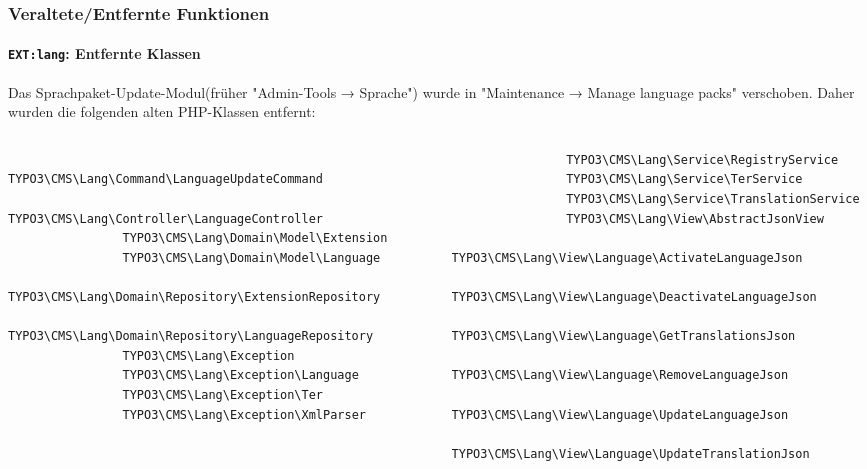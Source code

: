 \begin{frame}[fragile]
	\frametitle{Veraltete/Entfernte Funktionen}
	\framesubtitle{\texttt{EXT:lang}: Entfernte Klassen }

	\lstset{basicstyle=\tiny\ttfamily}

	Das Sprachpaket-Update-Modul(früher "Admin-Tools → Sprache")
	wurde in "Maintenance → Manage language packs" verschoben.
	\newline\newline
	Daher wurden die folgenden alten PHP-Klassen entfernt:

	\begin{columns}[T]
		\begin{column}{.5\textwidth}
			\begin{lstlisting}
				TYPO3\CMS\Lang\Command\LanguageUpdateCommand
				TYPO3\CMS\Lang\Controller\LanguageController
				TYPO3\CMS\Lang\Domain\Model\Extension
				TYPO3\CMS\Lang\Domain\Model\Language
				TYPO3\CMS\Lang\Domain\Repository\ExtensionRepository
				TYPO3\CMS\Lang\Domain\Repository\LanguageRepository
				TYPO3\CMS\Lang\Exception
				TYPO3\CMS\Lang\Exception\Language
				TYPO3\CMS\Lang\Exception\Ter
				TYPO3\CMS\Lang\Exception\XmlParser
			\end{lstlisting}
		\end{column}
		\begin{column}{.5\textwidth}
			\begin{lstlisting}
				TYPO3\CMS\Lang\Service\RegistryService
				TYPO3\CMS\Lang\Service\TerService
				TYPO3\CMS\Lang\Service\TranslationService
				TYPO3\CMS\Lang\View\AbstractJsonView
				TYPO3\CMS\Lang\View\Language\ActivateLanguageJson
				TYPO3\CMS\Lang\View\Language\DeactivateLanguageJson
				TYPO3\CMS\Lang\View\Language\GetTranslationsJson
				TYPO3\CMS\Lang\View\Language\RemoveLanguageJson
				TYPO3\CMS\Lang\View\Language\UpdateLanguageJson
				TYPO3\CMS\Lang\View\Language\UpdateTranslationJson
			\end{lstlisting}
		\end{column}
	\end{columns}

\end{frame}


